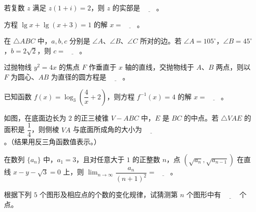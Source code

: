 \begin{question}
若复数 $z$ 满足 $z(1+i)=2$，则 $z$ 的实部是 $\underline{\qquad}$。

\end{question}
\begin{question}
方程 $\lg x+\lg(x+3)=1$ 的解 $x=\underline{\qquad}$。

\end{question}
\begin{question}
在 $\triangle ABC$ 中，$a,b,c$ 分别是 $\angle A$、$\angle B$、$\angle C$ 所对的边。若 $\angle A=105^\circ$，$\angle B=45^\circ$，$b=2\sqrt{2}$，则 $c=\underline{\qquad}$。

\end{question}
\begin{question}
过抛物线 $y^2=4x$ 的焦点 $F$ 作垂直于 $x$ 轴的直线，交抛物线于 $A$、$B$ 两点，则以 $F$ 为圆心、$AB$ 为直径的圆方程是 $\underline{\qquad}$。

\end{question}
\begin{question}
已知函数 $f(x)=\log_3\left(\dfrac{4}{x}+2\right)$，则方程 $f^{-1}(x)=4$ 的解 $x=\underline{\qquad}$。

\Needspace{0.4\textheight}
\end{question}
\begin{question}
如图，在底面边长为 $2$ 的正三棱锥 $V-ABC$ 中，$E$ 是 $BC$ 的中点。若 $\triangle VAE$ 的面积是 $\dfrac{1}{4}$，则侧棱 $VA$ 与底面所成角的大小为 $\underline{\qquad}$。（结果用反三角函数值表示。）
\nopagebreak[4]
\begin{center}\end{center}
\nopagebreak[4]
\end{question}
\begin{question}
在数列 $\{a_n\}$ 中，$a_1=3$，且对任意大于 $1$ 的正整数 $n$，点 $(\sqrt{a_n},\sqrt{a_{n-1}})$ 在直线 $x-y-\sqrt{3}=0$ 上，则 $\displaystyle\lim_{n\to\infty}\dfrac{a_n}{(n+1)^2}=\underline{\qquad}$。

\Needspace{0.4\textheight}
\end{question}
\begin{question}
根据下列 $5$ 个图形及相应点的个数的变化规律，试猜测第 $n$ 个图形中有 $\underline{\qquad}$ 个点。
\nopagebreak[4]
\begin{center}\end{center}
\nopagebreak[4]
\end{question}
